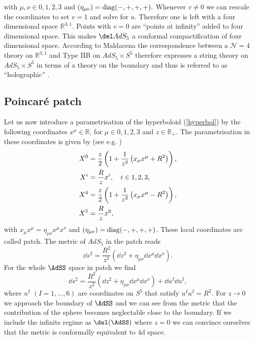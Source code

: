 with $\mu,\nu \in {0,1,2,3}$ and $\left(\eta_{\mu \nu}\right) = {\rm diag}(-,+,+,+).$ Whenever $v \neq 0$ we can rescale the coordinates to set $v = 1$ and solve for $u$. Therefore one is left with a four dimensional  space $\mathbb{R}^{3,1}$. Points with $v=0$ are ``points at infinity'' added to four dimensional  space. This makes $\del AdS_{5}$ a conformal compactification of four dimensional  space. According to Maldacena \cite{maldacena1} the correspondence between a $\mathcal{N}=4$ theory on $\mathbb{R}^{3,1}$ and Type IIB on $AdS_{5}\times S^{5}$ therefore expresses a string theory on $AdS_{5}\times S^{5}$ in terms of a theory on the boundary and thus is referred to as ``holographic'' \cite{Witten:1998qj}.
%
%
\subsection{Poincaré patch}\label{p_patch}
Let us now introduce a parametrisation of the hyperboloid (\ref{hyperbol}) by the following coordinates $x^{\mu} \in \mathbb{R}$, for $\mu \in {0,1,2,3}$ and $z \in \mathbb{R}_{+}$. The parametrisation in these coordinates is given by (see e.g. \cite{Ammon:2015wua,Bayona:2005nq})
\begin{align}
X^{0} &= \frac{z}{2} \left( 1+ \frac{1}{z^{2}}\left( x_{\mu}x^{\mu} + R^{2}\right) \right), \notag \\
X^{i} &= \frac{R}{z}x^{i},\quad i\in {1,2,3}, \\
X^{4} &= \frac{z}{2} \left( 1 + \frac{1}{z^{2}} \left(x_{\mu}x^{\mu} -R^{2} \right) \right), \notag \\
X^{5} &= \frac{R}{z}x^{0}, \notag
\end{align}
with $x_{\mu}x^{\mu}=\eta_{\mu\nu}x^{\mu}x^{\nu}$ and $\left(\eta_{\mu \nu}\right) = {\rm diag}(-,+,+,+)$. These local coordinates are called  patch. The metric of $AdS_{5}$ in the  patch reads
\begin{equation}
\dd s^{2} = \frac{R^{2}}{z^{2}}\left(\dd z^{2} + \eta_{\mu \nu} \dd x^{\mu} \dd x^{\nu} \right).
\end{equation}
%
%
For the whole $\AdSS$ space in  patch we find 
%
%
\begin{equation}
\dd s^{2} = \frac{R^{2}}{z^{2}}\left(\dd z^{2} + \eta_{\mu \nu} \dd x^{\mu} \dd x^{\nu} \right) + \dd u^{I}\dd u^{I},
\end{equation}
%
%
where $u^{I}$ $(I=1,\ldots,6)$ are coordinates on $S^{5}$ that satisfy $u^{I}u^{I}=R^{2}$. For $z\to 0$ we approach the boundary of $\AdSS$ and we can see from the metric that the contribution of the sphere becomes neglectable close to the boundary. If we include the infinite regime as $\del (\AdSS)$ where $z=0$ we can convince ourselves that the metric is conformally equivalent to 4d  space.
%
%
%
%
%
%
